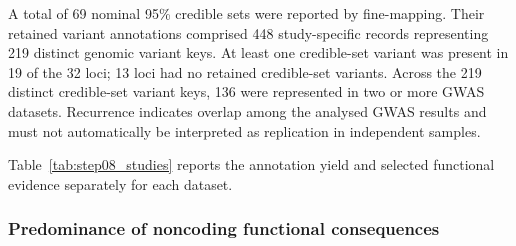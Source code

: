 \documentclass[11pt,a4paper]{article}
\begin{document}
A total of 69 nominal 95\% credible sets were reported
by fine-mapping. Their retained variant annotations
comprised 448 study-specific records representing
219 distinct genomic variant keys. At least one
credible-set variant was present in 19 of the 32 loci;
13 loci had no retained credible-set variants.
Across the 219 distinct credible-set variant keys,
136 were represented in two or more GWAS datasets.
Recurrence indicates overlap among the analysed GWAS
results and must not automatically be interpreted as
replication in independent samples.

Table~\ref{tab:step08_studies} reports the annotation yield
and selected functional evidence separately for each dataset.

\begin{table}[htbp]
\centering
\small
\setlength{\tabcolsep}{4pt}
\caption{Step~08 study-level annotation results. All counts
refer to study-specific variant records. A 95\% credible-set
(CS) variant is a retained variant record flagged by SuSiE-RSS.
The PIP threshold is $\geq0.9$. cCRE denotes overlap with an
ENCODE candidate cis-regulatory element; RDB denotes the
pipeline-defined RegulomeDB 1--2 evidence flag.}
\label{tab:step08_studies}
\end{table}

\subsubsection{Predominance of noncoding functional consequences}
\end{document}
